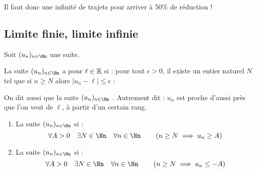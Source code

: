 \documentclass[class=report,crop=false]{standalone}
\begin{document}
Il faut donc une infinité de trajets pour arriver à 50\% de réduction !


\subsection{Limite finie, limite infinie}

Soit $(u_n)_{n\in \Nn}$ une suite.

\begin{definition}
\label{def_lim}
  La suite $(u_n)_{n\in \Nn}$ a pour  $\ell\in \mathbb{R}$ si :
pour tout $\epsilon >0$, il existe un entier naturel $N$ tel que si $n\geq N$ alors
$\lvert u_n-\ell\rvert\leq\epsilon$ :
\end{definition}

On dit aussi que la suite $(u_n)_{n\in \Nn}$ .
Autrement dit : $u_n$ est proche d'aussi près que l'on veut de $\ell$, à partir d'un certain rang.


\begin{definition}
\sauteligne
\begin{enumerate}
  \item   La suite $(u_n)_{n\in \Nn}$  si :
\[ \forall A >0 \quad \exists N \in \Nn \quad
    \forall n \in \Nn \qquad \left( n\geq N \implies u_n\geq A \right)\]
\item La suite $(u_n)_{n\in \Nn}$  si :
\[ \forall A >0 \quad \exists N \in \Nn \quad
    \forall n \in \Nn \qquad \left( n\geq N \implies u_n\leq -A \right)\]
\end{enumerate}
\end{definition}
\end{document}
